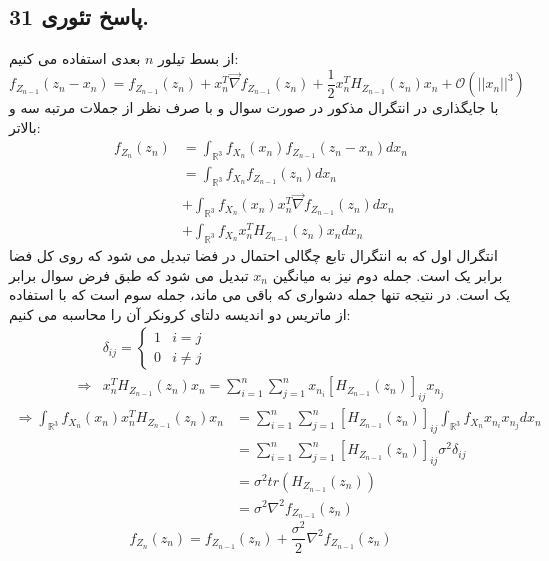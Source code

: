 \documentclass[]{article}
\begin{document}
\subsection{پاسخ تئوری 31.}
از بسط تیلور $n$ بعدی استفاده می کنیم:
\begin{equation}
	\nonumber
	f_{Z_{n-1}}(z_n - x_n) = f_{Z_{n-1}}(z_n) + x_n^T \vec{\nabla}f_{Z_{n-1}}(z_n) + \frac{1}{2} x_n^T H_{Z_{n-1}}(z_n) x_n + \mathcal{O}(||x_n||^3)
\end{equation}
با جایگذاری در انتگرال مذکور در صورت سوال و با صرف نظر از جملات مرتبه سه و بالاتر:
\begin{equation}
	\nonumber
	\begin{split}
		f_{Z_n}(z_n) &= \int_{\mathbb{R}^3} f_{X_n}(x_n) f_{Z_{n-1}}(z_n - x_n) dx_n\\
		&= \int_{\mathbb{R}^3} f_{X_n}f_{Z_{n-1}}(z_n) dx_n \\
		&+ \int_{\mathbb{R}^3} f_{X_n}(x_n) x_n^T \vec{\nabla}f_{Z_{n-1}}(z_n) dx_n\\
		&+ \int_{\mathbb{R}^3} f_{X_n} x_n^T H_{Z_{n-1}}(z_n) x_n dx_n		
	\end{split}
\end{equation}
انتگرال اول که به انتگرال تابع چگالی احتمال در فضا تبدیل می شود که روی کل فضا برابر یک است. جمله دوم نیز به میانگین 
$x_n$
 تبدیل می شود که طبق فرض سوال برابر یک است. در نتیجه تنها جمله دشواری که باقی می ماند، جمله سوم است که با استفاده از ماتریس دو اندیسه دلتای کرونکر آن را محاسبه می کنیم:
 \begin{equation}
 	\nonumber
 	\begin{split}
 		& \delta_{ij} = 
 		\begin{cases}
 			1 &\mbox{$i = j$}\\
 			0 &\mbox{$i \neq j$}
 		\end{cases}
 		\\
 		\Rightarrow & x_n^T H_{Z_{n-1}}(z_n) x_n = \sum_{i = 1}^{n} \sum_{j = 1}^{n} x_{n_i}[H_{Z_{n-1}}(z_n)]_{ij} x_{n_j}
 	\end{split}
 \end{equation}
 \begin{equation}
 	\nonumber
 	\begin{split}
 		\Rightarrow \int_{\mathbb{R}^3} f_{X_n}(x_n) x_n^T H_{Z_{n-1}}(z_n) x_n &= \sum_{i = 1}^{n} \sum_{j = 1}^{n} [H_{Z_{n-1}}(z_n)]_{ij} \int_{\mathbb{R}^3} f_{X_n}x_{n_i} x_{n_j} dx_n\\
 		&=\sum_{i = 1}^{n} \sum_{j = 1}^{n} [H_{Z_{n-1}}(z_n)]_{ij} \sigma^2 \delta_{ij}\\
 		&=\sigma^2tr(H_{Z_{n-1}}(z_n))\\
 		&=\sigma^2 \nabla^2 f_{Z_{n-1}}(z_n)
 	\end{split}
 \end{equation}
 \begin{equation}
 	\nonumber
 	f_{Z_n}(z_n) = f_{Z_{n-1}}(z_n) + \frac{\sigma^2}{2} \nabla^2 f_{Z_{n-1}}(z_n)
 \end{equation}
\newpage
\end{document}
